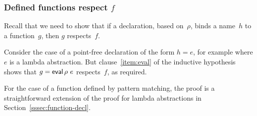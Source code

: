 
\subsubsection{Defined functions respect $f$}

Recall that we need to show that if a declaration, based on~$\rho$, binds a
name~$h$ to a function~$g$, then $g$ respects~$f$.

Consider the case of a point-free declaration of the form $h = e$, for example
where $e$ is a lambda abstraction.  But clause~\ref{item:eval} of the inductive
hypothesis shows that $g = \mathop{\sf eval} \rho~e$ respects~$f$, as required.


For the case of a function defined by pattern matching, the proof is a
straightforward extension of the proof for lambda abstractions in
Section~\ref{sssec:function-decl}.



